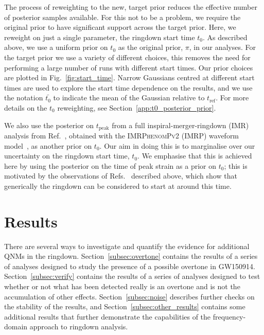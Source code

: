 The process of reweighting to the new, target prior reduces the effective number of posterior samples available.
For this not to be a problem, we require the original prior to have significant support across the target prior.
Here, we reweight on just a single parameter, the ringdown start time $t_0$.
As described above, we use a uniform prior on $t_0$ as the original prior, $\pi$, in our analyses.
For the target prior we use a variety of different choices, this removes the need for performing a large number of runs with different start times. 
Our prior choices are plotted in Fig.~\ref{fig:start_time}.
Narrow Gaussians centred at different start times are used to explore the start time dependence on the results, and we use the notation $\bar{t_0}$ to indicate the mean of the Gaussian relative to $t_\mathrm{ref}$. 
For more details on the $t_0$ reweighting, see Section~\ref{app:t0_posterior_prior}.

We also use the posterior on $t_\mathrm{peak}$ from a full inspiral-merger-ringdown (IMR) analysis from Ref.~\cite{Isi:2022mhy}, obtained with the \textsc{IMRPhenomPv2} (IMRP) waveform model~\cite{Hannam:2013oca}, as another prior on $t_0$. 
Our aim in doing this is to marginalise over our uncertainty on the ringdown start time, $t_0$. 
We emphasise that this is achieved here by using the posterior on the time of peak strain as a prior on $t_0$; this is motivated by the observations of Refs.~\cite{Giesler:2019uxc, Bhagwat:2019dtm, Ota:2019bzl, Cook:2020otn, JimenezForteza:2020cve, Dhani:2020nik, Finch:2021iip, Forteza:2021wfq, Dhani:2021vac, MaganaZertuche:2021syq} described above, which show that generically the ringdown can be considered to start at around this time.


\section{Results}\label{sec:results}

There are several ways to investigate and quantify the evidence for additional QNMs in the ringdown.
Section~\ref{subsec:overtone} contains the results of a series of analyses designed to study the presence of a possible overtone in GW150914.
Section~\ref{subsec:verify} contains the results of a series of analyses designed to test whether or not what has been detected really is an overtone and is not the accumulation of other effects.
Section~\ref{subsec:noise} describes further checks on the stability of the results, and Section~\ref{subsec:other_results} contains some additional results that further demonstrate the capabilities of the frequency-domain approach to ringdown analysis.

